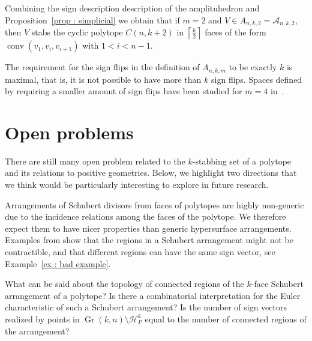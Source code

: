 \documentclass[english]{ourlematema}
\DeclareMathOperator{\Gr}{Gr}
\DeclareMathOperator{\conv}{conv}
\DeclareMathOperator{\sign}{sign}
\newcommand{\mA}{\mathcal{A}}
\newcommand{\HPk}{\mathcal{H}_P^k}
\begin{document}
\begin{rem}\label{amplituhedron stabbing}
    Combining the sign description description of the amplituhedron and Proposition~\ref{prop : simplicial} we obtain that if $m=2$ and  $V\in A_{n,k,2} = \mA_{n,k,2}$, then $V$ stabs the cyclic polytope $C(n,k+2)$ in $\left\lceil\frac{k}{2}\right\rceil$ faces of the form $\conv(v_1,v_i, v_{i+1})$ with $1<i<n-1$.
\end{rem}

The requirement for the sign flips in the definition of $A_{n,k,m}$ to be exactly $k$ is maximal, that is, it is not possible to have more than $k$ sign flips. Spaces defined by requiring a smaller amount of sign flips have been studied for $m=4$ in~\cite{gabriele}.

\section{Open problems}

There are still many open problem related to the $k$-stabbing set of a polytope and its relations to positive geometries. Below, we highlight two directions that we think would be particularly interesting to explore in future research.

\vspace{5pt}
Arrangements of Schubert divisors from faces of polytopes are highly non-generic due to the incidence relations among the faces of the polytope.
We therefore expect them to have nicer properties than generic hypersurface arrangements. Examples from \cite{Schubertarr} show that the regions in a Schubert arrangement might not be contractible, and that different regions can have the same sign vector, see Example~\ref{ex : bad example}.

\begin{que}
    What can be said about the topology of connected regions of the $k$-face Schubert arrangement of a polytope? Is there a combinatorial interpretation for the Euler characteristic of such a Schubert arrangement? Is the number of sign vectors realized by points in $\Gr(k,n)\setminus\HPk$ equal to the number of connected regions of the arrangement?
\end{que}
\end{document}
